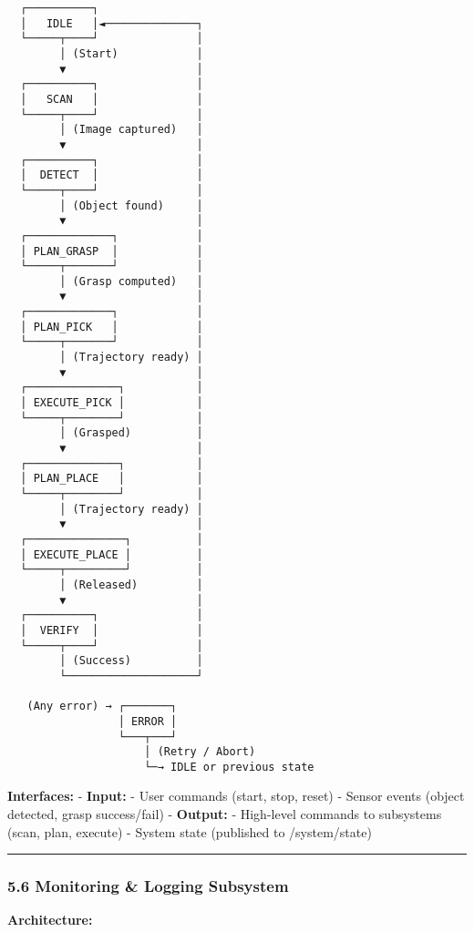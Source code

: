 \documentclass[
]{article}
\begin{document}
\begin{verbatim}
  ┌──────────┐
  │   IDLE   │◄──────────────┐
  └─────┬────┘               │
        │ (Start)            │
        ▼                    │
  ┌──────────┐               │
  │   SCAN   │               │
  └─────┬────┘               │
        │ (Image captured)   │
        ▼                    │
  ┌──────────┐               │
  │  DETECT  │               │
  └─────┬────┘               │
        │ (Object found)     │
        ▼                    │
  ┌─────────────┐            │
  │ PLAN_GRASP  │            │
  └─────┬───────┘            │
        │ (Grasp computed)   │
        ▼                    │
  ┌─────────────┐            │
  │ PLAN_PICK   │            │
  └─────┬───────┘            │
        │ (Trajectory ready) │
        ▼                    │
  ┌──────────────┐           │
  │ EXECUTE_PICK │           │
  └─────┬────────┘           │
        │ (Grasped)          │
        ▼                    │
  ┌──────────────┐           │
  │ PLAN_PLACE   │           │
  └─────┬────────┘           │
        │ (Trajectory ready) │
        ▼                    │
  ┌───────────────┐          │
  │ EXECUTE_PLACE │          │
  └─────┬─────────┘          │
        │ (Released)         │
        ▼                    │
  ┌──────────┐               │
  │  VERIFY  │               │
  └─────┬────┘               │
        │ (Success)          │
        └────────────────────┘

   (Any error) → ┌───────┐
                 │ ERROR │
                 └───┬───┘
                     │ (Retry / Abort)
                     └─→ IDLE or previous state
\end{verbatim}

\textbf{Interfaces:} - \textbf{Input:} - User commands (start, stop,
reset) - Sensor events (object detected, grasp success/fail) -
\textbf{Output:} - High-level commands to subsystems (scan, plan,
execute) - System state (published to /system/state)

\begin{center}\rule{0.5\linewidth}{0.5pt}\end{center}

\hypertarget{monitoring-logging-subsystem}{%
\subsubsection{5.6 Monitoring \& Logging
Subsystem}\label{monitoring-logging-subsystem}}

\textbf{Architecture:}
\end{document}

